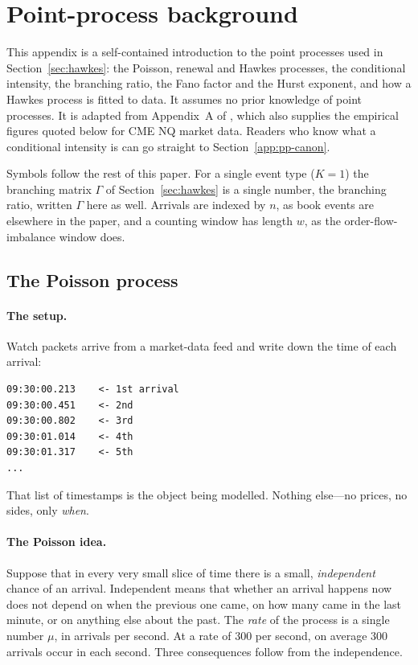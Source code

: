 \section{Point-process background}
\label{app:pp}

This appendix is a self-contained introduction to the point processes used in
Section~\ref{sec:hawkes}: the Poisson, renewal and Hawkes processes, the conditional intensity,
the branching ratio, the Fano factor and the Hurst exponent, and how a Hawkes process is fitted to
data. It assumes no prior knowledge of point processes. It is adapted from Appendix~A of
\citet{maciejewski2026packets}, which also supplies the empirical figures quoted below for CME NQ
market data. Readers who know what a conditional intensity is can go straight to
Section~\ref{app:pp-canon}.

Symbols follow the rest of this paper. For a single event type ($K = 1$) the branching matrix
$\Gamma$ of Section~\ref{sec:hawkes} is a single number, the branching ratio, written $\Gamma$ here
as well. Arrivals are indexed by $n$, as book events are elsewhere in the paper, and a counting
window has length $w$, as the order-flow-imbalance window does.

\subsection{The Poisson process}
\label{app:pp-poisson}

\paragraph{The setup.} Watch packets arrive from a market-data feed and write down the time of
each arrival:
\begin{verbatim}
09:30:00.213    <- 1st arrival
09:30:00.451    <- 2nd
09:30:00.802    <- 3rd
09:30:01.014    <- 4th
09:30:01.317    <- 5th
...
\end{verbatim}
That list of timestamps is the object being modelled. Nothing else---no prices, no sides, only
\emph{when}.

\paragraph{The Poisson idea.} Suppose that in every very small slice of time there is a small,
\emph{independent} chance of an arrival. Independent means that whether an arrival happens now does
not depend on when the previous one came, on how many came in the last minute, or on anything else
about the past. The \emph{rate} of the process is a single number $\mu$, in arrivals per second. At a
rate of $300$ per second, on average $300$ arrivals occur in each second. Three consequences follow
from the independence.

